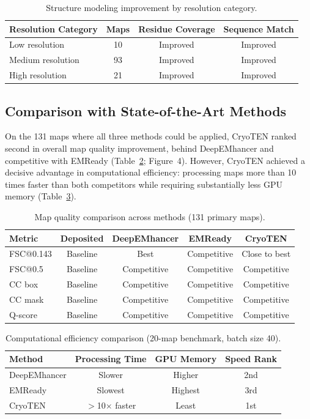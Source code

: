 \documentclass[11pt]{article}
\begin{document}
\begin{table}[H]
\centering
\caption{Structure modeling improvement by resolution category.}
\label{tab:resolution}
\begin{tabular}{lccc}
\toprule
Resolution Category & Maps & Residue Coverage & Sequence Match \\
\midrule
Low resolution & 10 & Improved & Improved \\
Medium resolution & 93 & Improved & Improved \\
High resolution & 21 & Improved & Improved \\
\bottomrule
\end{tabular}
\end{table}

\subsection{Comparison with State-of-the-Art Methods}

On the 131 maps where all three methods could be applied, CryoTEN ranked second in overall map quality improvement, behind DeepEMhancer and competitive with EMReady (Table~\ref{tab:comparison}; Figure~4). However, CryoTEN achieved a decisive advantage in computational efficiency: processing maps more than 10 times faster than both competitors while requiring substantially less GPU memory (Table~\ref{tab:efficiency}).

\begin{table}[H]
\centering
\caption{Map quality comparison across methods (131 primary maps).}
\label{tab:comparison}
\begin{tabular}{lcccc}
\toprule
Metric & Deposited & DeepEMhancer & EMReady & CryoTEN \\
\midrule
FSC@0.143 & Baseline & Best & Competitive & Close to best \\
FSC@0.5 & Baseline & Competitive & Competitive & Competitive \\
CC box & Baseline & Competitive & Competitive & Competitive \\
CC mask & Baseline & Competitive & Competitive & Competitive \\
Q-score & Baseline & Competitive & Competitive & Competitive \\
\bottomrule
\end{tabular}
\end{table}

\begin{table}[H]
\centering
\caption{Computational efficiency comparison (20-map benchmark, batch size 40).}
\label{tab:efficiency}
\begin{tabular}{lccc}
\toprule
Method & Processing Time & GPU Memory & Speed Rank \\
\midrule
DeepEMhancer & Slower & Higher & 2nd \\
EMReady & Slowest & Highest & 3rd \\
CryoTEN & $>$10$\times$ faster & Least & 1st \\
\bottomrule
\end{tabular}
\end{table}
\end{document}
